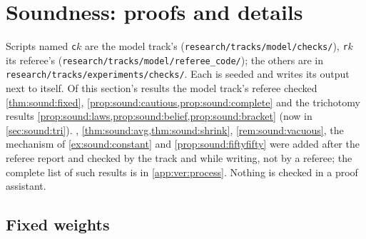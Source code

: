 \section{Soundness: proofs and details}\label{app:sound}

Scripts named \texttt{c}$k$ are the model track's (\nolinkurl{research/tracks/model/checks/}), \texttt{r}$k$ its referee's (\nolinkurl{research/tracks/model/referee_code/}); the others are in \nolinkurl{research/tracks/experiments/checks/}. Each is seeded and writes its output next to itself. Of this section's results the model track's referee checked \cref{thm:sound:fixed}, \cref{prop:sound:cautious,prop:sound:complete} and the trichotomy results \cref{prop:sound:laws,prop:sound:belief,prop:sound:bracket} (now in \cref{sec:sound:tri}). , \cref{thm:sound:avg,thm:sound:shrink}, \cref{rem:sound:vacuous}, the mechanism of \cref{ex:sound:constant} and \cref{prop:sound:fiftyfifty} were added after the referee report and checked by the track and while writing, not by a referee; the complete list of such results is in \cref{app:ver:process}. Nothing is checked in a proof assistant.

\subsection{Fixed weights}\label{app:sound:fixed}

